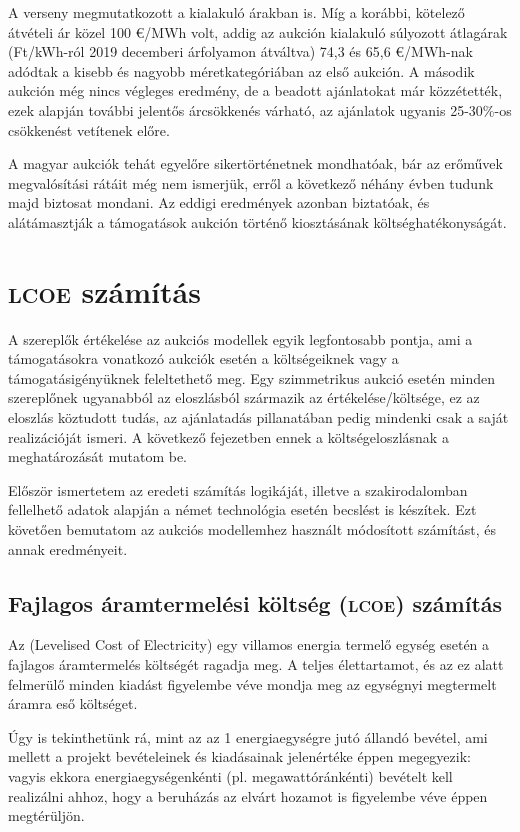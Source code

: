 \documentclass[twoside, magyar, showtrims]{corvinusphd}
\begin{document}
A verseny megmutatkozott a kialakuló árakban is. Míg a korábbi,
kötelező átvételi ár közel 100 €/MWh volt, addig az aukción
kialakuló súlyozott átlagárak (Ft/kWh-ról 2019 decemberi árfolyamon átváltva)
74,3 és 65,6 €/MWh-nak adódtak a kisebb és nagyobb méretkategóriában
az első aukción. A második aukción még nincs végleges eredmény,
de a beadott ajánlatokat már közzétették, ezek alapján
további jelentős árcsökkenés várható, az ajánlatok ugyanis
25-30\%-os csökkenést vetítenek előre. 

A magyar aukciók tehát egyelőre sikertörténetnek mondhatóak,
bár az erőművek megvalósítási rátáit még nem ismerjük,
erről a következő néhány évben tudunk majd biztosat mondani.
Az eddigi eredmények azonban biztatóak,
és alátámasztják a támogatások aukción történő
kiosztásának költséghatékonyságát.

\chapter{\textsc{lcoe} számítás}

\scwords A szereplők értékelése az aukciós
modellek egyik legfontosabb pontja,
ami a támogatásokra vonatkozó aukciók esetén
a költségeiknek vagy a támogatásigényüknek feleltethető meg.
Egy szimmetrikus aukció esetén minden szereplőnek
ugyanabból az eloszlásból származik az értékelése/költsége,
ez az eloszlás köztudott tudás, az ajánlatadás pillanatában
pedig mindenki csak a saját realizációját ismeri.
A következő fejezetben ennek a
költségeloszlásnak a meghatározását mutatom be.

Először ismertetem az eredeti  számítás logikáját,
illetve a szakirodalomban fellelhető
adatok alapján a német  technológia esetén becslést is készítek.
Ezt követően bemutatom az aukciós
modellemhez használt módosított  számítást,
és annak eredményeit. 

\section{Fajlagos áramtermelési költség (\textsc{lcoe}) számítás}

Az  (Levelised Cost of Electricity)
egy villamos energia termelő egység esetén
a fajlagos áramtermelés költségét ragadja meg.
A teljes élettartamot,
és az ez alatt felmerülő minden kiadást figyelembe véve
mondja meg az egységnyi megtermelt áramra eső költséget.

Úgy is tekinthetünk rá, mint az az 1 energiaegységre jutó állandó bevétel,
ami mellett a projekt bevételeinek és kiadásainak jelenértéke éppen megegyezik:
vagyis ekkora energiaegységenkénti
(pl. megawattóránkénti) bevételt kell realizálni ahhoz,
hogy a beruházás az elvárt hozamot is figyelembe véve éppen megtérüljön.
\end{document}
